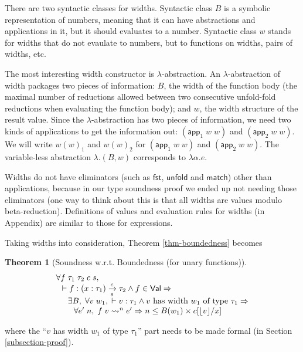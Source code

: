 \documentclass[preprint]{sigplanconf}
\newcommand{\arrow}[4]{#1\xrightarrow[#3]{#2}#4}
\newcommand{\symmatch}{\mathsf{match}}
\newcommand{\symunfold}{\mathsf{unfold}}
\newcommand{\vtos}[1]{\lfloor #1 \rfloor}
\newcommand{\symapp}{\mathsf{app}}
\newcommand{\symfst}{\mathsf{fst}}
\newtheorem{thm}{Theorem}
\begin{document}
There are two syntactic classes for widths. Syntactic class $B$ is a symbolic representation of numbers, meaning that it can have abstractions and applications in it, but it should evaluates to a number. Syntactic class $w$ stands for widths that do not evaulate to numbers, but to functions on widths, pairs of widths, etc. 

The most interesting width constructor is $\lambda$-abstraction. An $\lambda$-abstraction of width packages two pieces of information: $B$, the width of the function body (the maximal number of reductions allowed between two consecutive unfold-fold reductions when evaluating the function body); and $w$, the width structure of the result value. Since the $\lambda$-abstraction has two pieces of information, we need two kinds of applications to get the information out: $(\symapp_1\;w\;w)$ and $(\symapp_2\;w\;w)$. We will write $w(w)_1$ and $w(w)_2$ for $(\symapp_1\;w\;w)$ and $(\symapp_2\;w\;w)$. The variable-less abstraction $\lambda.(B,w)$ corresponds to $\lambda\alpha.e$. 

Widths do not have eliminators (such as $\symfst$, $\symunfold$ and $\symmatch$) other than applications, because in our type soundness proof we ended up not needing those eliminators (one way to think about this is that all widths are values modulo beta-reduction). Definitions of values and evaluation rules for widths (in Appendix) are similar to those for expressions. 

Taking widths into consideration, Theorem \ref{thm-boundedness} becomes
\begin{thm}[\label{thm-boundedness'}Soundness w.r.t. Boundedness (for unary functions)]
$$
\begin{array}{l}
\forall f\;\tau_1\;\tau_2\;c\;s, \\
\hspace{0.1in} \vdash f:\arrow{(x:\tau_1)}{c}{s}{\tau_2} \wedge f\in\mathsf{Val}\Rightarrow \\
\hspace{0.2in} \exists B, \;\forall v\;w_1,\; \vdash v:\tau_1 \wedge v\textrm{\ has\ width\ } w_1 \textrm{\ of\ type\ }\tau_1 \Rightarrow \\
\hspace{0.3in} \forall e'\;n,\; f\;v\leadsto^n e' \Rightarrow n\leq B(w_1)\times c[\vtos{v}/x]
\end{array}
$$
\end{thm}
where the ``$v$ has width $w_1$ of type $\tau_1$'' part needs to be made formal (in Section \ref{subsection-proof}). 
\end{document}
